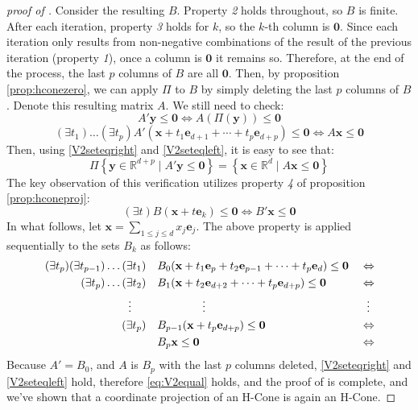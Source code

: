 \documentclass[fleqn]{article}
\renewcommand{\vec}[1]{\mathbf{#1}}
\newcommand{\set}[1]{\left\{#1\right\}}
\newcommand{\R}{\mathbb{R}}
\newcommand{\0}{\vec{0}}
\newcommand{\x}{\vec{x}}
\newcommand{\y}{\vec{y}}
\newcommand{\e}{\vec{e}}
\newcommand{\st}{\;|\;}
\newcommand{\Udim}{p}
\begin{document}
\begin{proof}[proof of \Vproj]
Consider the resulting $B$.  Property \textit{2} holds throughout, so $B$ is finite.  After each iteration, property \textit{3} holds for $k$, so the $k$-th column is $\0$.  Since each iteration only results from non-negative combinations of the result of the previous iteration (property \textit{1}), once a column is $\0$ it remains so.  Therefore, at the end of the process, the last $p$ columns of $B$ are all $\0$.  Then, by proposition \ref{prop:hconezero}, we can apply $\Pi$ to $B$ by simply deleting the last $p$ columns of $B$.  Denote this resulting matrix $A$.  We still need to check:
\begin{equation}\label{V2seteqright}
   A'\y \leq \0 \Leftrightarrow A(\Pi(\y)) \leq \0 
\end{equation}
\begin{equation}\label{V2seteqleft}
  (\exists t_1)\dots(\exists t_p) A'(\x+t_1\e_{d+1}+\cdots+t_p\e_{d+p}) \leq \0
          \Leftrightarrow A\x \leq \0
\end{equation}
Then, using \eqref{V2seteqright} and \eqref{V2seteqleft}, it is easy to see that:
\begin{equation}\label{eq:V2equal}
   \Pi\set{\y\in\R^{d+\Udim}\st A'\y\leq\0} = \set{\x\in\R^{d}\st A\x\leq\0} 
\end{equation}
The key observation of this verification utilizes property \textit{4} of proposition \ref{prop:hconeproj}:
  \[ (\exists t)B(\x + t\e_k) \leq \0 \Leftrightarrow B'\x \leq \0 \]
In what follows, let $\x = \sum_{1 \leq j \leq d}x_j\e_j$.  The above property is applied sequentially to the sets $B_k$ as follows:
\begin{alignat*}{2}
  (\exists t_p)(\exists t_{p-1})\dots(\exists t_1)&\quad 
                B_0(\x + t_1\e_{p} + t_2\e_{p-1} + \dots + t_p\e_{d}) \leq \0\;&
                   \Leftrightarrow \\
               (\exists t_p)\dots(\exists t_2)&\quad 
                B_1(\x + t_2\e_{d+2} + \dots + t_p\e_{d+p}) 
                    \leq \0 &\Leftrightarrow \\
           \vdots \hspace{1.3em} & \hspace{5em}\vdots & \vdots\hspace{0.4em} \\
   (\exists t_p)&\quad B_{p-1}(\x + t_p\e_{d+p})  \leq \0 & \Leftrightarrow \\
           &\quad B_{p}\x  \leq \0 & \Leftrightarrow
\end{alignat*}
Because $A' = B_0$, and $A$ is $B_p$ with the last $p$ columns deleted, \eqref{V2seteqright} and \eqref{V2seteqleft} hold, therefore \eqref{eq:V2equal} holds, and the proof of {\Vproj} is complete, and we've shown that a coordinate projection of an H-Cone is again an H-Cone.
\end{proof}
\end{document}
